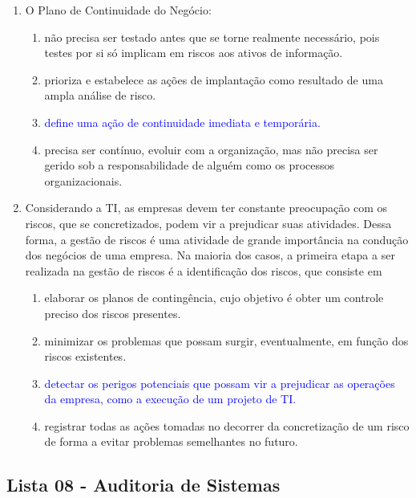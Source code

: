 \documentclass{report}
\begin{document}
\begin{enumerate}
		\item O Plano de Continuidade do Negócio:
		\begin{enumerate}[label=(\alph*)]
			\item não precisa ser testado antes que se torne realmente necessário, pois testes por si só implicam em riscos aos ativos de informação.
			\item prioriza e estabelece as ações de implantação como resultado de uma ampla análise de risco.
			\item \textcolor{blue}{define uma ação de continuidade imediata e temporária.}
			\item precisa ser contínuo, evoluir com a organização, mas não precisa ser gerido sob a responsabilidade de alguém como os processos organizacionais.
		\end{enumerate}
		
		\item Considerando a TI, as empresas devem ter constante preocupação com os riscos, que se concretizados, podem vir a prejudicar suas atividades. Dessa forma, a gestão de riscos é uma atividade de grande importância na condução dos negócios de uma empresa. Na maioria dos casos, a primeira etapa a ser realizada na gestão de riscos é a identificação dos riscos, que consiste em
		\begin{enumerate}[label=(\alph*)]
			\item elaborar os planos de contingência, cujo objetivo é obter um controle preciso dos riscos presentes.
			\item minimizar os problemas que possam surgir, eventualmente, em função dos riscos existentes.
			\item \textcolor{blue}{detectar os perigos potenciais que possam vir a prejudicar as operações da empresa, como a execução de um projeto de TI.}
			\item registrar todas as ações tomadas no decorrer da concretização de um risco de forma a evitar problemas semelhantes no futuro.
		\end{enumerate}
		
	\end{enumerate}
	
	
	
	
	
	
	
	
	
	
	
	
	\subsection{Lista 08 - Auditoria de Sistemas}
	
\end{document}

